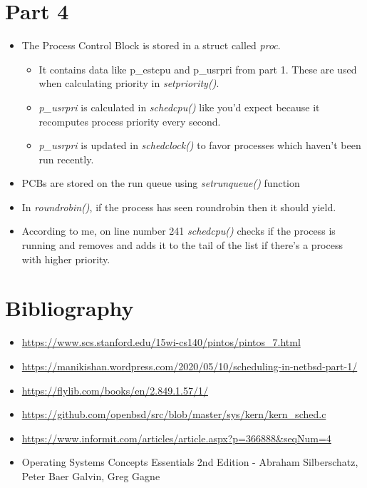 \documentclass[11pt]{article}
\begin{document}
\section{Part 4}
\label{sec:orgb8aca31}
\begin{itemize}
\item The Process Control Block is stored in a struct called \emph{proc}.\\
\begin{itemize}
\item It contains data like p\_estcpu and p\_usrpri from part 1. These are used when calculating priority in \emph{setpriority()}.\\
\item \emph{p\_usrpri} is calculated in \emph{schedcpu()} like you'd expect because it recomputes process priority every second.\\
\item \emph{p\_usrpri} is updated in \emph{schedclock()} to favor processes which haven't been run recently.\\
\end{itemize}

\item PCBs are stored on the run queue using \emph{setrunqueue()} function\\

\item In \emph{roundrobin()}, if the process has seen roundrobin then it should yield.\\

\item According to me, on line number 241 \emph{schedcpu()} checks if the process is running and removes and adds it to the tail of the list if there's a process with higher priority.\\
\end{itemize}


\section{Bibliography}
\label{sec:orgea2c841}
\begin{itemize}
\item \url{https://www.scs.stanford.edu/15wi-cs140/pintos/pintos\_7.html}\\
\item \url{https://manikishan.wordpress.com/2020/05/10/scheduling-in-netbsd-part-1/}\\
\item \url{https://flylib.com/books/en/2.849.1.57/1/}\\
\item \url{https://github.com/openbsd/src/blob/master/sys/kern/kern\_sched.c}\\
\item \url{https://www.informit.com/articles/article.aspx?p=366888\&seqNum=4}\\
\item Operating Systems Concepts Essentials 2nd Edition - Abraham Silberschatz, Peter Baer Galvin, Greg Gagne\\
\end{itemize}
\end{document}
